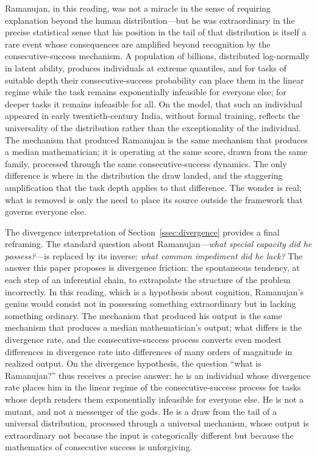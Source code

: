 \documentclass{article}
\begin{document}
Ramanujan, in this reading, was not a miracle in the sense of requiring explanation beyond the human distribution---but he was extraordinary in the precise statistical sense that his position in the tail of that distribution is itself a rare event whose consequences are amplified beyond recognition by the consecutive-success mechanism. A population of billions, distributed log-normally in latent ability, produces individuals at extreme quantiles, and for tasks of suitable depth their consecutive-success probability can place them in the linear regime while the task remains exponentially infeasible for everyone else; for deeper tasks it remains infeasible for all. On the model, that such an individual appeared in early twentieth-century India, without formal training, reflects the universality of the distribution rather than the exceptionality of the individual. The mechanism that produced Ramanujan is the same mechanism that produces a median mathematician; it is operating at the same score, drawn from the same family, processed through the same consecutive-success dynamics. The only difference is where in the distribution the draw landed, and the staggering amplification that the task depth applies to that difference. The wonder is real; what is removed is only the need to place its source outside the framework that governs everyone else.

The divergence interpretation of Section~\ref{ssec:divergence} provides a final reframing. The standard question about Ramanujan---\emph{what special capacity did he possess?}---is replaced by its inverse: \emph{what common impediment did he lack?} The answer this paper proposes is divergence friction: the spontaneous tendency, at each step of an inferential chain, to extrapolate the structure of the problem incorrectly. In this reading, which is a hypothesis about cognition, Ramanujan's genius would consist not in possessing something extraordinary but in lacking something ordinary. The mechanism that produced his output is the same mechanism that produces a median mathematician's output; what differs is the divergence rate, and the consecutive-success process converts even modest differences in divergence rate into differences of many orders of magnitude in realized output. On the divergence hypothesis, the question ``what is Ramanujan?'' thus receives a precise answer: he is an individual whose divergence rate places him in the linear regime of the consecutive-success process for tasks whose depth renders them exponentially infeasible for everyone else. He is not a mutant, and not a messenger of the gods. He is a draw from the tail of a universal distribution, processed through a universal mechanism, whose output is extraordinary not because the input is categorically different but because the mathematics of consecutive success is unforgiving.
\end{document}
